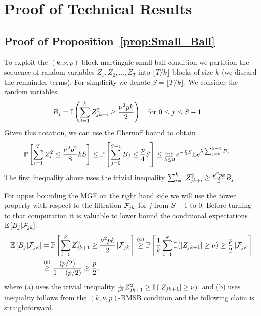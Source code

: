 \section{Proof of Technical Results\label{sec:proof_technical}}
 \subsection{Proof of Proposition~\ref{prop:Small_Ball}\label{sec:proof_small_ball}}
To exploit the $(k, \nu, p)$ block martingale small-ball condition we partition the sequence of random variables $Z_1, Z_2, \ldots, Z_T$ into
 $\lfloor T/k \rfloor$ blocks of size $k$ (we discard the remainder terms). For simplicity we denote $S = \lfloor T/k\rfloor$. We consider the random variables
%
\begin{align*}
\block_{j} &= \I\left(\sum_{i=1}^k Z_{jk+i}^2 \ge  \frac{\nu^2 p k}{2} \right)\quad \text{for } 0 \leq j \leq S - 1.%
\end{align*}
%
Given this notation, we can use the Chernoff bound to obtain
\begin{align}\label{eq:chernoff_martingale}
  \mathbb{P}\left[\sum_{i=1}^T Z_i^2 \le \frac{\nu^2p^2}{8} k S \right] &\leq \mathbb{P}\left[\sum_{j=0}^{S - 1} B_{j} \le \frac{p}{4}S \right]\leq \inf_{\lambda \leq 0} e^{-\frac{p}{4}S}\mathbb{E} e^{\lambda \sum_{j = 0}^{S - 1}B_j}.
\end{align}
The first inequality above uses the trivial inequality
$\sum_{i=1}^{k} Z_{jk+i}^2 \geq \frac{\nu^2 p k}{2} B_j$.

For upper bounding the MGF on the right hand side we will use the tower property with respect to the filtration $\mathcal{F}_{jk}$ for $j$ from $S-1$ to $0$. Before turning to that computation it is valuable to lower bound the conditional expectations $\mathbb{E} \left[B_{j} |\mathcal{F}_{jk}\right]$:
\begin{align*}
  \mathbb{E} \left[B_{j} |\mathcal{F}_{jk}\right] &= \mathbb{P}\left[\sum_{i = 1}^{k} Z_{jk + 1}^2 \geq \frac{\nu^2 p k}{2}\left|\mathcal{F}_{jk} \right.\right] \stackrel{(a)}{\geq} \mathbb{P}\left[\frac{1}{k}\sum_{i = 1}^k \mathbb{I}\left(|Z_{jk + 1}| \geq \nu\right) \geq \frac{p}{2}\left| \mathcal{F}_{jk}\right.\right] \\
  &\stackrel{(b)}{\geq} \frac{(p/2)}{1-(p/2)} \geq \frac{p}{2},
\end{align*}
where (a)
uses the trivial inequality $\frac{1}{\nu^2} Z_{jk+1}^2 \geq \mathbb{I}\left(|Z_{jk + 1}| \geq \nu\right)$,
%
and (b) uses inequality follows from the $(k, \nu, p)$-BMSB condition and the following claim is straightforward.

